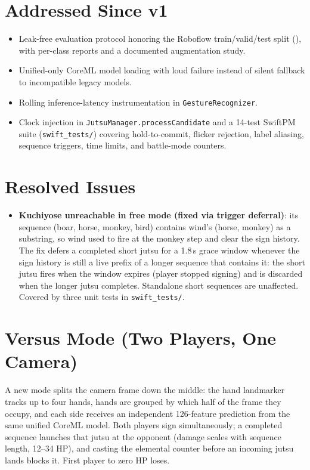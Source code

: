 \section{Addressed Since v1}
\begin{itemize}[leftmargin=2em]
\item Leak-free evaluation protocol honoring the Roboflow train/valid/test split (\texttt{}), with per-class reports and a documented augmentation study.
\item Unified-only CoreML model loading with loud failure instead of silent fallback to incompatible legacy models.
\item Rolling inference-latency instrumentation in \texttt{GestureRecognizer}.
\item Clock injection in \texttt{JutsuManager.processCandidate} and a 14-test SwiftPM suite (\texttt{swift\_tests/}) covering hold-to-commit, flicker rejection, label aliasing, sequence triggers, time limits, and battle-mode counters.
\end{itemize}

\section{Resolved Issues}
\begin{itemize}[leftmargin=2em]
\item \textbf{Kuchiyose unreachable in free mode (fixed via trigger deferral)}: its sequence (boar, horse, monkey, bird) contains wind's (horse, monkey) as a substring, so wind used to fire at the monkey step and clear the sign history. The fix defers a completed short jutsu for a 1.8\,s grace window whenever the sign history is still a live prefix of a longer sequence that contains it: the short jutsu fires when the window expires (player stopped signing) and is discarded when the longer jutsu completes. Standalone short sequences are unaffected. Covered by three unit tests in \texttt{swift\_tests/}.
\end{itemize}

\section{Versus Mode (Two Players, One Camera)}
A new mode splits the camera frame down the middle: the hand landmarker
tracks up to four hands, hands are grouped by which half of the frame they
occupy, and each side receives an independent 126-feature prediction from
the same unified CoreML model. Both players sign simultaneously; a
completed sequence launches that jutsu at the opponent (damage scales with
sequence length, 12--34 HP), and casting the elemental counter before an
incoming jutsu lands blocks it. First player to zero HP loses.

